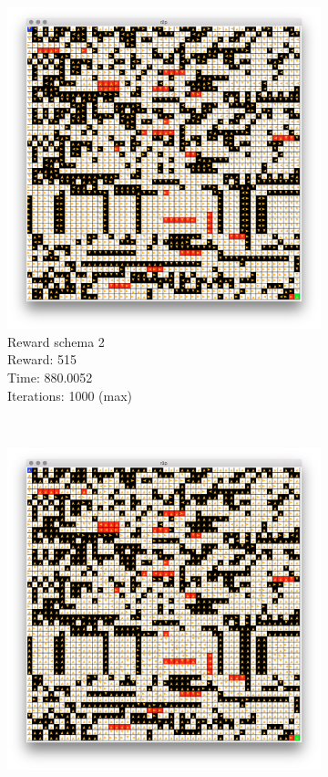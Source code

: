 \documentclass[a4paper,10pt]{article}
\begin{document}
\begin{figure}[H]
\begin{subfigure}[b]{0.3\textwidth}
                \includegraphics[width=\textwidth]{figures/50x50_p_r2.png}
                \caption{Reward schema 2\\
                Reward: 515 \\
                Time:  880.0052\\
                Iterations: 1000 (max) }
                \label{fig:tiger}
        \end{subfigure}
        ~ %
        \begin{subfigure}[b]{0.3\textwidth}
                \includegraphics[width=\textwidth]{figures/50x50_p_r3.png}

\end{subfigure}
\end{figure}
\end{document}
